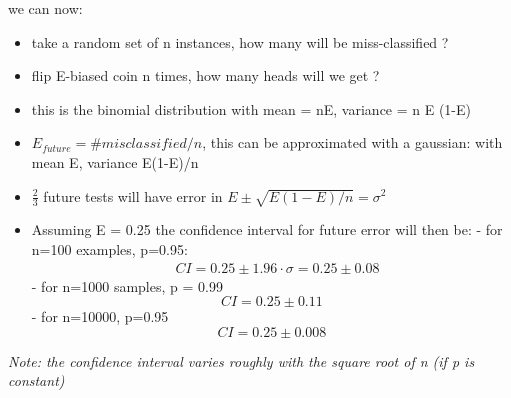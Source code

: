 \documentclass{article}
\begin{document}
{    we can now:
    \begin{itemize}[noitemsep]
        \item take a random set of n instances, how many will be miss-classified ?
        \item flip E-biased coin n times, how many heads will we get ?
        \item this is the binomial distribution with mean = nE, variance = n E (1-E)
        \item $E_{future} = \# misclassified / n$, this can be approximated with a gaussian: with mean E, variance E(1-E)/n
        \item $\frac{2}{3}$ future tests will have error in $E \pm \sqrt{E(1-E)/n} = \sigma^{2}$
        \item Assuming E = 0.25 the confidence interval for future error will then be:
            \subitem- for n=100 examples, p=0.95: 
                \begin{equation}
                    \begin{aligned}
                        &CI = 0.25 \pm 1.96 \cdot \sigma = 0.25 \pm 0.08
                    \end{aligned}
                \end{equation}   
            \subitem- for n=1000 samples, p = 0.99
            \begin{equation}
                CI = 0.25 \pm 0.11 
            \end{equation}
            \subitem- for n=10000, p=0.95
            \begin{equation}
                CI = 0.25 \pm 0.008
            \end{equation}
    \end{itemize}

    \textit{Note: the confidence interval varies roughly with the square root of n (if p is constant)}
    }

\end{document}
